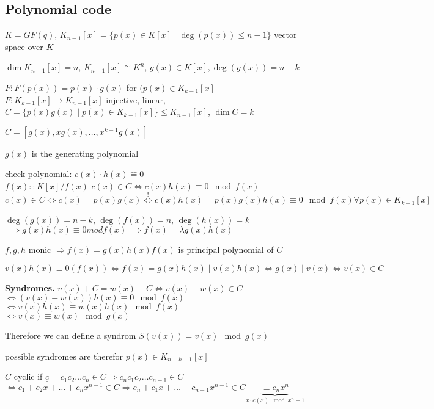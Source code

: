 \subsection{Polynomial code}
$K= GF(q)$, $K_{n-1}[x] = \{p(x) \in K[x] \mid \deg(p(x)) \leq n-1\}$ vector space over $K$

$\dim K_{n-1}[x] = n$, $K_{n-1}[x] \cong K^n$, $g(x) \in K[x], \deg(g(x)) = n-k$

$F: F(p(x)) = p(x) \cdot g(x)$ for $(p(x) \in K_{k-1}[x]$\\
$F: K_{k-1}[x] \rightarrow K_{n-1}[x]$ injective, linear, $C= \{p(x)g(x) \mid p(x) \in K_{k-1}[x]\} \leq K_{n-1}[x]$, $\dim C = k$

$C= [g(x), xg(x), \ldots, x^{k-1} g(x)]$

$g(x)$ is the generating polynomial

check polynomial: $c(x)\cdot h(x) \hat{=} 0$\\
$f(x):: K[x] / f(x)$ \quad $c(x) \in C \Leftrightarrow c(x)h(x) \equiv 0 \mod f(x)$\\
$c(x) \in C \Leftrightarrow c(x) = p(x)g(x) \stackrel{!}{\Leftrightarrow} c(x)h(x)=p(x)g(x)h(x) \equiv 0 \mod f(x) \forall p(x) \in K_{k-1}[x]$

$\deg(g(x)) = n-k$, $\deg(f(x)) = n$, $\deg(h(x)) = k$\\
$\implies g(x)h(x) \equiv 0 mod f(x) \implies f(x) = \lambda g(x)h(x)$

$f,g,h$ monic $\Rightarrow f(x) = g(x)h(x)$\quad$f(x)$ is principal polynomial of $C$

$v(x)h(x) \equiv 0 (f(x)) \Leftrightarrow f(x)=g(x)h(x) \mid v(x)h(x) \Leftrightarrow g(x) \mid v(x) \Leftrightarrow v(x)\in C $

\textbf{Syndromes.} 
$v(x)+C = w(x) + C \Leftrightarrow v(x) - w(x) \in C$\\
$\Leftrightarrow (v(x)-w(x))h(x) \equiv 0 \mod f(x)$\\
$\Leftrightarrow v(x)h(x) \equiv w(x)h(x) \mod f(x)$ \\
$\Leftrightarrow v(x) \equiv w(x) \mod g(x)$

Therefore we can define a syndrom $S(v(x)) = v(x) \mod g(x)$

possible syndromes are therefor $p(x) \in K_{n-k-1}[x]$

\begin{definition}
  $C$ cyclic if $ \underline{c} = c_1c_2\ldots c_n \in C \Rightarrow c_nc_1c_2\ldots c_{n-1} \in C$\\
  $\Leftrightarrow c_1 + c_2 x+ \ldots + c_n x^{n-1} \in C \Rightarrow c_n + c_1 x + \ldots + c_{n-1} x^{n-1} \in C \underbrace{\equiv c_n x^n}_{x\cdot c(x) \mod x^n-1}$
\end{definition}

